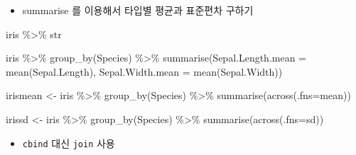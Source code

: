 \documentclass[
]{book}
\newenvironment{Shaded}{\begin{snugshade}}{\end{snugshade}}
\newcommand{\AttributeTok}[1]{\textcolor[rgb]{0.77,0.63,0.00}{#1}}
\newcommand{\FunctionTok}[1]{\textcolor[rgb]{0.00,0.00,0.00}{#1}}
\newcommand{\NormalTok}[1]{#1}
\newcommand{\OtherTok}[1]{\textcolor[rgb]{0.56,0.35,0.01}{#1}}
\newcommand{\SpecialCharTok}[1]{\textcolor[rgb]{0.00,0.00,0.00}{#1}}
\providecommand{\tightlist}{%
  \setlength{\itemsep}{0pt}\setlength{\parskip}{0pt}}
\begin{document}
\begin{itemize}
\tightlist
\item
  summarise 를 이용해서 타입별 평균과 표준편차 구하기
\end{itemize}

\begin{Shaded}
\begin{Highlighting}[]
\NormalTok{iris }\SpecialCharTok{\%\textgreater{}\%}\NormalTok{ str}

\NormalTok{iris }\SpecialCharTok{\%\textgreater{}\%} 
  \FunctionTok{group\_by}\NormalTok{(Species) }\SpecialCharTok{\%\textgreater{}\%} 
  \FunctionTok{summarise}\NormalTok{(}\AttributeTok{Sepal.Length.mean =} \FunctionTok{mean}\NormalTok{(Sepal.Length),}
            \AttributeTok{Sepal.Width.mean =} \FunctionTok{mean}\NormalTok{(Sepal.Width))}


\NormalTok{irismean }\OtherTok{\textless{}{-}}\NormalTok{ iris }\SpecialCharTok{\%\textgreater{}\%} 
  \FunctionTok{group\_by}\NormalTok{(Species) }\SpecialCharTok{\%\textgreater{}\%} 
  \FunctionTok{summarise}\NormalTok{(}\FunctionTok{across}\NormalTok{(}\AttributeTok{.fns=}\NormalTok{mean))}

\NormalTok{irissd }\OtherTok{\textless{}{-}}\NormalTok{ iris }\SpecialCharTok{\%\textgreater{}\%} 
  \FunctionTok{group\_by}\NormalTok{(Species) }\SpecialCharTok{\%\textgreater{}\%} 
  \FunctionTok{summarise}\NormalTok{(}\FunctionTok{across}\NormalTok{(}\AttributeTok{.fns=}\NormalTok{sd))}
\end{Highlighting}
\end{Shaded}

\begin{itemize}
\tightlist
\item
  \texttt{cbind} 대신 \texttt{join} 사용
\end{itemize}
\end{document}

